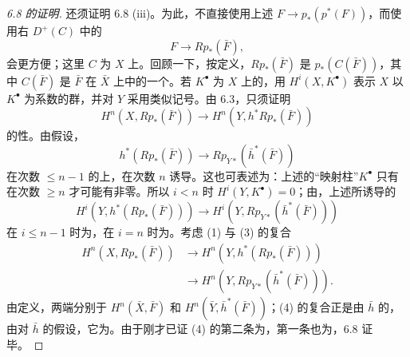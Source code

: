 \begin{proof}[6.8 的证明]
还须证明 6.8 (iii)。为此，不直接使用上述 $F\to p_*(p^*(F))$，而使用右 $D^+(C)$ 中的
\[
F\longrightarrow Rp_*(\bar F),
\]
会更方便；这里 $C$ 为 $X$ 上。回顾一下，按定义，$Rp_*(\bar F)$ 是 $p_*(C(\bar F))$，其中 $C(\bar F)$ 是 $\bar F$ 在 $\bar X$ 上中的一个。若 $K^\bullet$ 为 $X$ 上的，用 $H^i(X,K^\bullet)$ 表示 $X$ 以 $K^\bullet$ 为系数的群，并对 $Y$ 采用类似记号。由 6.3，只须证明
\[
H^n(X,Rp_*(\bar F))\longrightarrow H^n(Y,h^*Rp_*(\bar F))\tag{1}
\]
的性。由假设，
\[
h^*(Rp_*(\bar F))\longrightarrow Rp_{Y*}(\bar h^*(\bar F))\tag{2}
\]
在次数 $\leq n-1$ 的上，在次数 $n$ 诱导。这也可表述为：上述的“映射柱”$K^\bullet$ 只有在次数 $\geq n$ 才可能有非零。所以 $i<n$ 时 $H^i(Y,K^\bullet)=0$；由，上述所诱导的
\[
H^i(Y,h^*(Rp_*(\bar F)))\longrightarrow H^i(Y,Rp_{Y*}(\bar h^*(\bar F)))\tag{3}
\]
在 $i\leq n-1$ 时为，在 $i=n$ 时为。考虑 (1) 与 (3) 的复合
\[
\begin{aligned}
H^n(X,Rp_*(\bar F))&\longrightarrow H^n(Y,h^*(Rp_*(\bar F)))\\
&\longrightarrow H^n(Y,Rp_{Y*}(\bar h^*(\bar F))).
\end{aligned}\tag{4}
\]
由定义，两端分别于 $H^n(\bar X,\bar F)$ 和 $H^n(\bar Y,\bar h^*(\bar F))$；(4) 的复合正是由 $\bar h$ 的，由对 $\bar h$ 的假设，它为。由于刚才已证 (4) 的第二条为，第一条也为，6.8 证毕。
\end{proof}

